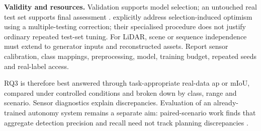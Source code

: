 \textbf{Validity and resources.} Validation supports model selection;
an untouched real test set supports final assessment
\parencite{raschkaModelEvaluationModel2020}.
\Textcite{westphalImprovingModelSelection2019} explicitly address
selection-induced optimism using a multiple-testing correction; their
specialised procedure does not justify ordinary repeated test-set tuning.
For LiDAR, scene or sequence independence must extend to generator inputs
and reconstructed assets. Report sensor calibration, class mappings,
preprocessing, model, training budget, repeated seeds and real-label access.

RQ3 is therefore best answered through task-appropriate real-data
\gls{ap} or mIoU, compared under controlled conditions and broken down by
class, range and scenario. Sensor diagnostics explain discrepancies.
Evaluation of an already-trained autonomy system remains a separate aim:
paired-scenario work finds that aggregate detection precision and recall
need not track planning discrepancies
\parencite{manivasagamZeroDomainGap2023}.
